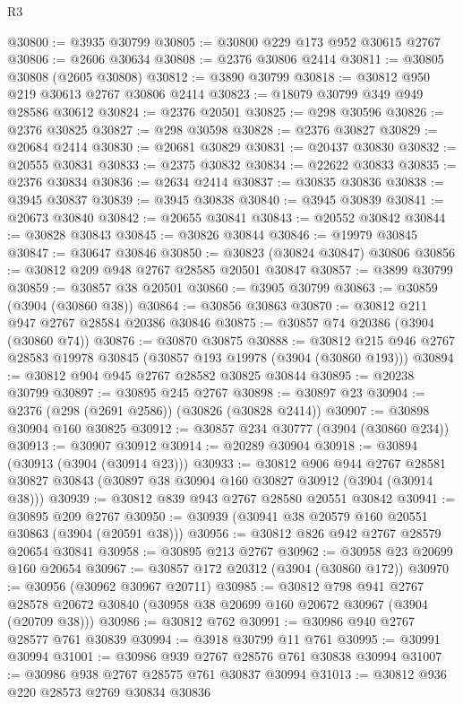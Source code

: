 \begin{lexlean}{R3}
\begin{coremodule}
@30800 := @3935 @30799
@30805 := @30800 @229 @173 @952 @30615 @2767
@30806 := @2606 @30634
@30808 := @2376 @30806 @2414
@30811 := @30805 @30808 (@2605 @30808)
@30812 := @3890 @30799
@30818 := @30812 @950 @219 @30613 @2767 @30806 @2414
@30823 := @18079 @30799 @349 @949 @28586 @30612
@30824 := @2376 @20501
@30825 := @298 @30596
@30826 := @2376 @30825
@30827 := @298 @30598
@30828 := @2376 @30827
@30829 := @20684 @2414
@30830 := @20681 @30829
@30831 := @20437 @30830
@30832 := @20555 @30831
@30833 := @2375 @30832
@30834 := @22622 @30833
@30835 := @2376 @30834
@30836 := @2634 @2414
@30837 := @30835 @30836
@30838 := @3945 @30837
@30839 := @3945 @30838
@30840 := @3945 @30839
@30841 := @20673 @30840
@30842 := @20655 @30841
@30843 := @20552 @30842
@30844 := @30828 @30843
@30845 := @30826 @30844
@30846 := @19979 @30845
@30847 := @30647 @30846
@30850 := @30823 (@30824 @30847) @30806
@30856 := @30812 @209 @948 @2767 @28585 @20501 @30847
@30857 := @3899 @30799
@30859 := @30857 @38 @20501
@30860 := @3905 @30799
@30863 := @30859 (@3904 (@30860 @38))
@30864 := @30856 @30863
@30870 := @30812 @211 @947 @2767 @28584 @20386 @30846
@30875 := @30857 @74 @20386 (@3904 (@30860 @74))
@30876 := @30870 @30875
@30888 := @30812 @215 @946 @2767 @28583 @19978 @30845 (@30857 @193 @19978 (@3904 (@30860 @193)))
@30894 := @30812 @904 @945 @2767 @28582 @30825 @30844
@30895 := @20238 @30799
@30897 := @30895 @245 @2767
@30898 := @30897 @23
@30904 := @2376 (@298 (@2691 @2586)) (@30826 (@30828 @2414))
@30907 := @30898 @30904 @160 @30825
@30912 := @30857 @234 @30777 (@3904 (@30860 @234))
@30913 := @30907 @30912
@30914 := @20289 @30904
@30918 := @30894 (@30913 (@3904 (@30914 @23)))
@30933 := @30812
    @906
    @944
    @2767
    @28581
    @30827
    @30843
    (@30897 @38 @30904 @160 @30827 @30912 (@3904 (@30914 @38)))
@30939 := @30812 @839 @943 @2767 @28580 @20551 @30842
@30941 := @30895 @209 @2767
@30950 := @30939 (@30941 @38 @20579 @160 @20551 @30863 (@3904 (@20591 @38)))
@30956 := @30812 @826 @942 @2767 @28579 @20654 @30841
@30958 := @30895 @213 @2767
@30962 := @30958 @23 @20699 @160 @20654
@30967 := @30857 @172 @20312 (@3904 (@30860 @172))
@30970 := @30956 (@30962 @30967 @20711)
@30985 := @30812
    @798
    @941
    @2767
    @28578
    @20672
    @30840
    (@30958 @38 @20699 @160 @20672 @30967 (@3904 (@20709 @38)))
@30986 := @30812 @762
@30991 := @30986 @940 @2767 @28577 @761 @30839
@30994 := @3918 @30799 @11 @761
@30995 := @30991 @30994
@31001 := @30986 @939 @2767 @28576 @761 @30838 @30994
@31007 := @30986 @938 @2767 @28575 @761 @30837 @30994
@31013 := @30812 @936 @220 @28573 @2769 @30834 @30836

\end{coremodule}
\end{lexlean}
